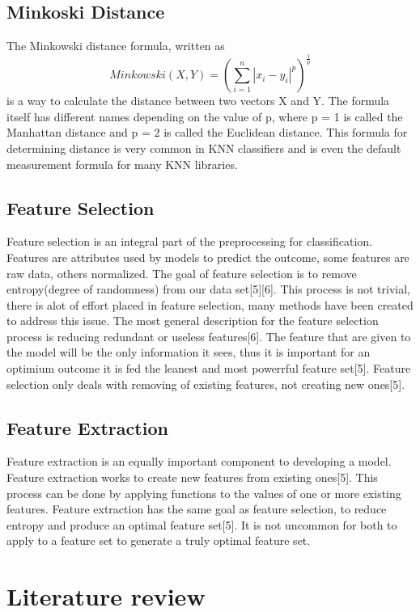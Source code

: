 \documentclass[confrence]{IEEEtran}
\begin{document}
\subsection*{Minkoski Distance}
The Minkowski distance formula, written as \[ Minkowski(X,Y) = (\sum_{i=1}^n|x_i-y_i|^p)^\frac{1}{p}\] is a way to calculate the distance between two vectors X and Y.
The formula itself has different names depending on the value of p, where p = 1 is called the Manhattan distance and p = 2 is called the Euclidean distance.
This formula for determining distance is very common in KNN classifiers and is even the default measurement formula for many KNN libraries.
\subsection*{Feature Selection}
Feature selection is an integral part of the preprocessing for classification.
Features are attributes used by models to predict the outcome, some features are raw data, others normalized.
The goal of feature selection is to remove entropy(degree of randomness) from our data set[5][6].
This process is not trivial, there is alot of effort placed in feature selection, many methods have been created to address this issue.
The most general description for the feature selection process is reducing redundant or useless features[6].
The feature that are given to the model will be the only information it sees, thus it is important for an optimium outcome it is fed the leanest and most powerrful feature set[5].
Feature selection only deals with removing of existing features, not creating new ones[5].
\subsection*{Feature Extraction}
Feature extraction is an equally important component to developing a model.
Feature extraction works to create new features from existing ones[5].
This process can be done by applying functions to the values of one or more existing features.
Feature extraction has the same goal as feature selection, to reduce entropy and produce an optimal feature set[5].
It is not uncommon for both to apply to a feature set to generate a truly optimal feature set.
\section*{Literature review}
\end{document}
